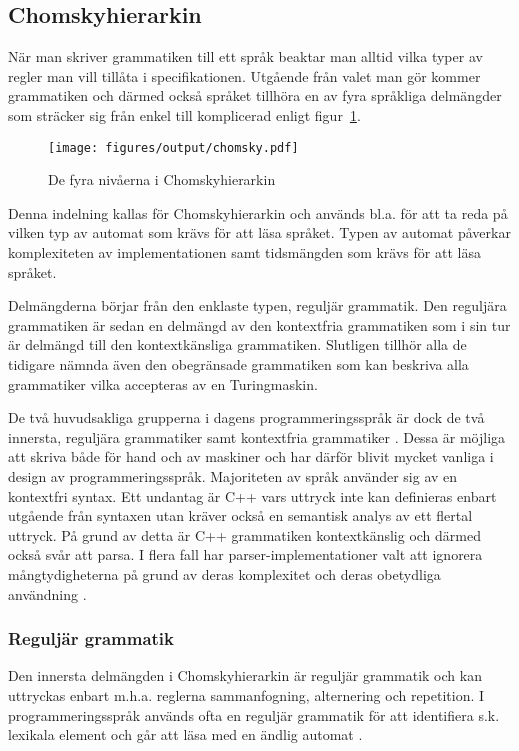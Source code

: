 \subsection{Chomskyhierarkin}

När man skriver grammatiken till ett språk beaktar man alltid vilka
typer av regler man vill tillåta i specifikationen. Utgående från valet man
gör kommer grammatiken och därmed också språket tillhöra en av fyra språkliga
delmängder som sträcker sig från enkel till komplicerad \citep[s. 19]{gd08}
enligt figur~\ref{fig:chomskyhierarki}.

\begin{figure}[ht]
  \texttt{[image: figures/output/chomsky.pdf]}
  \caption{De fyra nivåerna i Chomskyhierarkin}
  \label{fig:chomskyhierarki}
\end{figure}

Denna indelning kallas för Chomskyhierarkin och används bl.a. för att ta reda
på vilken typ av automat som krävs för att läsa språket. Typen av automat
påverkar komplexiteten av implementationen samt tidsmängden som krävs för att
läsa språket.

Delmängderna börjar från den enklaste typen, reguljär grammatik. Den
reguljära grammatiken är sedan en delmängd av den kontextfria grammatiken som i
sin tur är delmängd till den kontextkänsliga grammatiken. Slutligen tillhör
alla de tidigare nämnda även den obegränsade grammatiken som kan
beskriva alla grammatiker vilka accepteras av en Turingmaskin.

De två huvudsakliga grupperna i dagens programmeringsspråk är dock de två
innersta, reguljära grammatiker samt kontextfria grammatiker \citep[s.
100]{sm09}. Dessa är möjliga att skriva både för hand och av maskiner och har
därför blivit mycket vanliga i design av programmeringsspråk. Majoriteten av
språk använder sig av en kontextfri syntax. Ett undantag är C++ vars
uttryck inte kan definieras enbart utgående från syntaxen utan kräver också en
semantisk analys av ett flertal uttryck. På grund av detta är C++ grammatiken
kontextkänslig och därmed också svår att parsa. I flera fall har
parser-implementationer valt att ignorera mångtydigheterna på grund av deras
komplexitet och deras obetydliga användning \citep[s. 2]{rt05}.

\subsubsection{Reguljär grammatik}

Den innersta delmängden i Chomskyhierarkin är reguljär grammatik och kan uttryckas
enbart m.h.a. reglerna sammanfogning, alternering och repetition. I
programmeringsspråk används ofta en reguljär grammatik för att identifiera
s.k. lexikala element och går att läsa med en ändlig automat \citep[s.
100]{sm09}.

